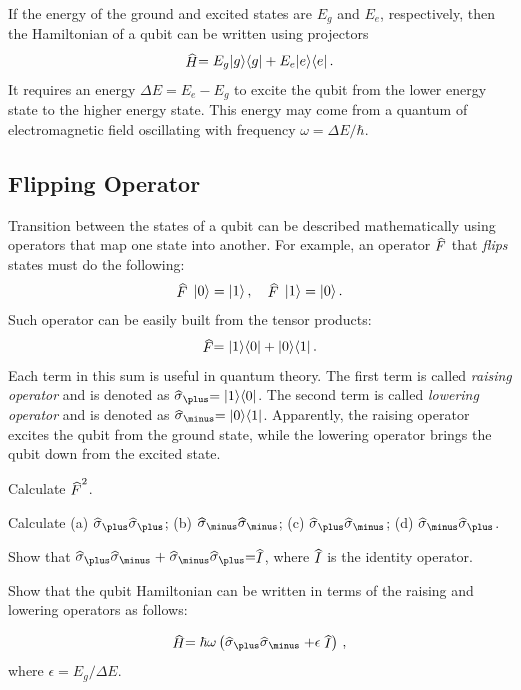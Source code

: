 If the energy of the ground and excited states are $E_g$ and $E_e$, respectively, then the Hamiltonian of a qubit can be written using projectors
\[
\op{H} = E_g\ketbra{g}{g}+E_e\ketbra{e}{e}\,.
\]
It requires an energy $\Delta E=E_e-E_g$ to excite the qubit from the lower energy state to the higher energy state. This energy may come from a quantum of electromagnetic field oscillating with frequency $\omega=\Delta E/\hbar$.

\subsection{Flipping Operator}
Transition between the states of a qubit can be described mathematically using operators that map one state into another. For example, an operator $\op{F}$ that \emph{flips} states must do the following:
\[
\op{F}\,\ket{0}=\ket{1}\,,\quad \op{F}\,\ket{1}=\ket{0}\,.
\]
Such operator can be easily built from the tensor products:
\[
\op{F} = \ketbra{1}{0}+\ketbra{0}{1}\,.
\]
Each term in this sum is useful in quantum theory. The first term is called \emph{raising operator} and is denoted as 
$ \op{\sigma}_\plus=\ketbra{1}{0}$. The second term is called \emph{lowering operator} and is denoted as $ \op{\sigma}_\minus=\ketbra{0}{1}$. Apparently, the raising operator excites the qubit from the ground state, while the lowering operator brings the qubit down from the excited state.
\begin{exercise}
	Calculate $\op{F}^2$.
\end{exercise}
\begin{exercise}
	Calculate (a) $\op{\sigma}_\plus \op{\sigma}_\plus$; (b) $\op{\sigma}_\minus \op{\sigma}_\minus$; (c) $\op{\sigma}_\plus \op{\sigma}_\minus$; (d) $\op{\sigma}_\minus \op{\sigma}_\plus$.
\end{exercise}

\begin{exercise}
	Show that  $\op{\sigma}_\plus \op{\sigma}_\minus+\op{\sigma}_\minus \op{\sigma}_\plus=\op{I}$, where $\op{I}$ is the identity operator.
\end{exercise}

\begin{exercise}
	Show that the qubit Hamiltonian can be written in terms of the raising and lowering operators as follows:
	
	\[
	\op{H} = \hbar\omega\left(\op{\sigma}_\plus \op{\sigma}_\minus+\epsilon\op{I} \right)\,,
	\]
	where $\epsilon=E_g/\Delta E$.
\end{exercise}

